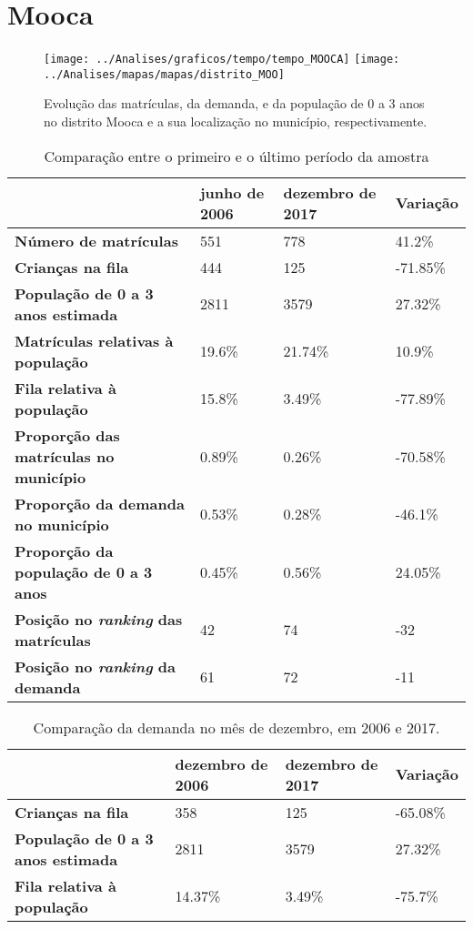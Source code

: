 \section{Mooca}
\begin{figure}[H]
\centering
\texttt{[image: ../Analises/graficos/tempo/tempo\_MOOCA]}
\texttt{[image: ../Analises/mapas/mapas/distrito\_MOO]}
\caption{Evolução das matrículas, da demanda, e da população de 0 a 3 anos no distrito Mooca e a sua localização no município, respectivamente.}
\end{figure}
\begin{table}[H]
\begin{tabular}{l|l|l|l}
\textbf{}                                      & \textbf{junho de 2006}       & \textbf{dezembro de 2017}    & \textbf{Variação} \\ \hline
\textbf{Número de matrículas}                  & 551 & 778 & 41.2\% \\ \hline
\textbf{Crianças na fila}                      & 444 & 125 & -71.85\% \\ \hline
\textbf{População de 0 a 3 anos estimada}      & 2811 & 3579 & 27.32\% \\ \hline
\textbf{Matrículas relativas à população}      & 19.6\% & 21.74\% & 10.9\% \\ \hline
\textbf{Fila relativa à população}             & 15.8\% & 3.49\% & -77.89\% \\ \hline
\textbf{Proporção das matrículas no município} & 0.89\% & 0.26\% & -70.58\% \\ \hline
\textbf{Proporção da demanda no município}     & 0.53\% & 0.28\% & -46.1\% \\ \hline
\textbf{Proporção da população de 0 a 3 anos}  & 0.45\% & 0.56\% & 24.05\% \\ \hline
\textbf{Posição no \textit{ranking} das matrículas}     & 42 & 74 & -32 \\ \hline
\textbf{Posição no \textit{ranking} da demanda}         & 61 & 72 & -11 \\ 
\end{tabular}
\caption{Comparação entre o primeiro e o último período da amostra}
\end{table}
\begin{table}[H]
\begin{tabular}{l|l|l|l}
\textbf{}                                 & \textbf{dezembro de 2006} & \textbf{dezembro de 2017} & \textbf{Variação} \\ \hline
\textbf{Crianças na fila}                      & 358 & 125 & -65.08\% \\ \hline
\textbf{População de 0 a 3 anos estimada}      & 2811 & 3579 & 27.32\% \\ \hline
\textbf{Fila relativa à população}             & 14.37\% & 3.49\% & -75.7\% \\
\end{tabular}
\caption{Comparação da demanda no mês de dezembro, em 2006 e 2017.}
\end{table}
